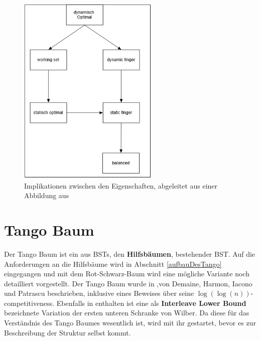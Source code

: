 \documentclass[a4paper,12pt]{article}
\begin{document}
\begin{figure}[h]
	\centering
	\includegraphics[width= 0.6\textwidth]{"Medien/DynOpt/upperBounds"}
	\caption{Implikationen zwischen den Eigenschaften, abgeleitet aus einer Abbildung aus \cite{upperBounds} }
	\label{fig:upperBounds}
\end{figure}


\section{Tango Baum} \label{TangoAbschnitt}
Der Tango Baum ist ein aus BSTs, den \textbf{Hilfsbäumen}, bestehender BST. Auf die Anforderungen an die Hilfsbäume wird in Abschnitt \ref{aufbauDesTango} eingegangen und mit dem Rot-Schwarz-Baum wird eine mögliche Variante noch detailliert vorgestellt. Der Tango Baum wurde in \cite{demainDinamicOpti},von Demaine, Harmon, Iacono und Patrascu beschrieben, inklusive eines Beweises über seine $\log\left(\log\left(n\right)\right)$-competitiveness. Ebenfalls in \cite{demainDinamicOpti} enthalten ist eine als \textbf{Interleave Lower Bound} bezeichnete Variation der ersten unteren Schranke von Wilber. Da diese für das Verständnis des Tango Baumes wesentlich ist, wird mit ihr gestartet, bevor es zur Beschreibung der Struktur selbst kommt. 
\end{document}
